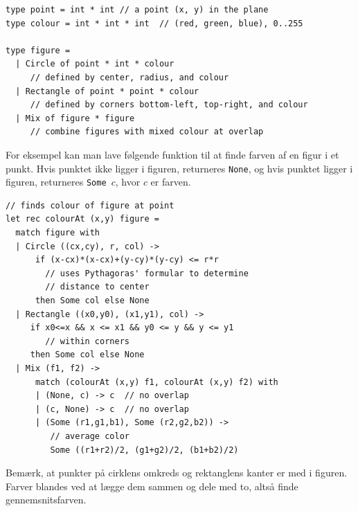 \documentclass[a4paper,12pt]{article}
\begin{document}
\begin{lstlisting}[numbers=none,frame=none,mathescape]
type point = int * int // a point (x, y) in the plane
type colour = int * int * int  // (red, green, blue), 0..255

type figure =
  | Circle of point * int * colour
     // defined by center, radius, and colour
  | Rectangle of point * point * colour
     // defined by corners bottom-left, top-right, and colour
  | Mix of figure * figure
     // combine figures with mixed colour at overlap
\end{lstlisting}

\noindent
For eksempel kan man lave følgende funktion til at finde farven af en
figur i et punkt.  Hvis punktet ikke ligger i figuren, returneres
\texttt{None}, og hvis punktet ligger i figuren, returneres
\texttt{Some $c$}, hvor $c$ er farven.

\begin{lstlisting}[numbers=none,frame=none,mathescape]
// finds colour of figure at point
let rec colourAt (x,y) figure =
  match figure with
  | Circle ((cx,cy), r, col) ->
      if (x-cx)*(x-cx)+(y-cy)*(y-cy) <= r*r
        // uses Pythagoras' formular to determine
        // distance to center
      then Some col else None
  | Rectangle ((x0,y0), (x1,y1), col) ->
     if x0<=x && x <= x1 && y0 <= y && y <= y1
        // within corners
     then Some col else None
  | Mix (f1, f2) ->
      match (colourAt (x,y) f1, colourAt (x,y) f2) with
      | (None, c) -> c  // no overlap
      | (c, None) -> c  // no overlap
      | (Some (r1,g1,b1), Some (r2,g2,b2)) ->
         // average color
         Some ((r1+r2)/2, (g1+g2)/2, (b1+b2)/2)
\end{lstlisting}

\noindent
Bemærk, at punkter på cirklens omkreds og rektanglens kanter er med i
figuren.  Farver blandes ved at lægge dem sammen og dele med to, altså
finde gennemsnitsfarven.
\end{document}
